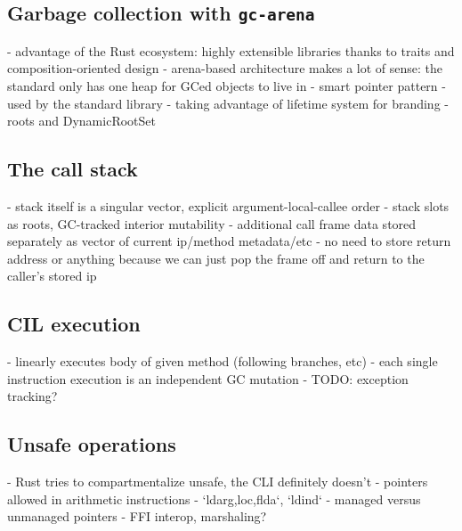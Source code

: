 \subsection{Garbage collection with \texttt{gc-arena}}
- advantage of the Rust ecosystem: highly extensible libraries thanks to traits and composition-oriented design
- arena-based architecture makes a lot of sense: the standard only has one heap for GCed objects to live in
- smart pointer pattern
    - used by the standard library
    - taking advantage of lifetime system for branding
- roots and DynamicRootSet

\subsection{The call stack}
- stack itself is a singular vector, explicit argument-local-callee order
    - stack slots as roots, GC-tracked interior mutability
- additional call frame data stored separately as vector of current ip/method metadata/etc
    - no need to store return address or anything because we can just pop the frame off and return to the caller's stored ip

\subsection{CIL execution}
- linearly executes body of given method (following branches, etc)
- each single instruction execution is an independent GC mutation
- TODO: exception tracking?

\subsection{Unsafe operations}
- Rust tries to compartmentalize unsafe, the CLI definitely doesn't
- pointers allowed in arithmetic instructions
- `ld{arg,loc,fld}a`, `ldind`
- managed versus unmanaged pointers
- FFI interop, marshaling?
